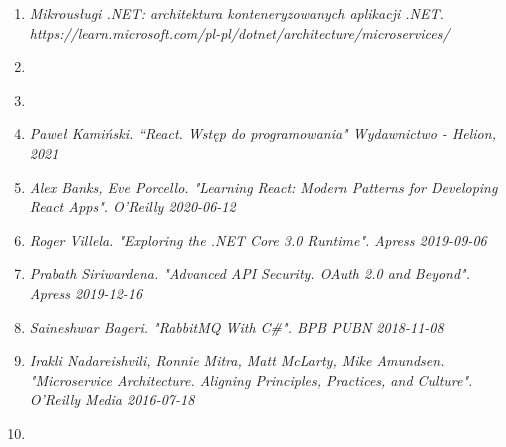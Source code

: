 \begin{enumerate}
\item {\textit {Mikrousługi .NET: architektura konteneryzowanych aplikacji .NET. \\ https://learn.microsoft.com/pl-pl/dotnet/architecture/microservices/}}
\item {\textit {}}
\item {\textit {}}
\item {\textit {Paweł Kamiński. “React. Wstęp do programowania" Wydawnictwo - Helion, 2021}}
\item {\textit { Alex Banks, Eve Porcello. "Learning React: Modern Patterns for Developing React Apps". O'Reilly 2020-06-12}}
\item {\textit{Roger Villela. "Exploring the .NET Core 3.0 Runtime". Apress 2019-09-06}}
\item {\textit {Prabath Siriwardena. "Advanced API Security. OAuth 2.0 and Beyond". Apress 2019-12-16}}
\item {\textit {Saineshwar Bageri. "RabbitMQ With C\#". BPB PUBN 2018-11-08}}
\item {\textit {Irakli Nadareishvili, Ronnie Mitra, Matt McLarty, Mike Amundsen. "Microservice Architecture. Aligning Principles, Practices, and Culture". O'Reilly Media 2016-07-18}}

\item {\textit {}}

\end{enumerate}
